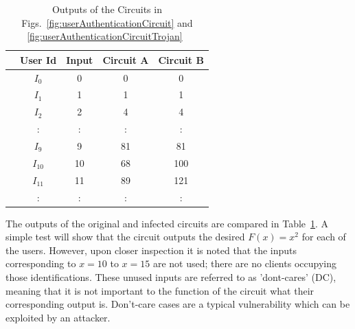 \documentclass[conference]{IEEEtran}
\begin{document}
\begin{table}[h]
	\centering
	\caption{Outputs of the Circuits in Figs.~\ref{fig:userAuthenticationCircuit} and \ref{fig:userAuthenticationCircuitTrojan}~\cite{samerAttribute}}
	\label{tbl:trojanOutputs}
	\begin{tabular}{|c|c|c|c|c|}
		\hline
		& User Id & Input & Circuit A & Circuit B \\ \hline
		\multirow{5}{*}{\rotatebox[origin=c]{90}{Inputs}} & $I_0$ & 0 & 0 & 0 \\ \cline{2-5} 
		& $I_1$ & 1 & 1 & 1 \\ \cline{2-5} 
		& $I_2$ & 2 & 4 & 4 \\ \cline{2-5} 
		& : & : & : & : \\ \cline{2-5} 
		& $I_9$ & 9 & 81 & 81 \\ \hline
		\multirow{3}{*}{\rotatebox[origin=c]{90}{DC}} & $I_{10}$ & 10 & 68 & 100 \\ \cline{2-5} 
		& $I_{11}$ & 11 & 89 & 121 \\ \cline{2-5} 
		& : & : & : & : \\ \hline
	\end{tabular}
\end{table}
The outputs of the original and infected circuits are compared in Table~\ref{tbl:trojanOutputs}.
A simple test will show that the circuit outputs the desired $F(x) = x^2$ for each of the users.
However, upon closer inspection it is noted that the inputs corresponding to $x = 10$ to $x = 15$ are not used; there are no clients occupying those identifications.
These unused inputs are referred to as 'dont-cares' (DC), meaning that it is not important to the function of the circuit what their corresponding output is.
Don't-care cases are a typical vulnerability which can be exploited by an attacker.
\end{document}
